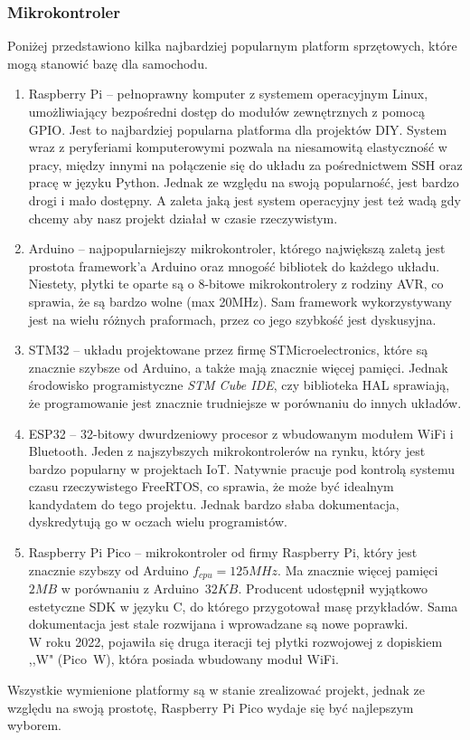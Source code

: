         \subsubsection{Mikrokontroler}
            Poniżej przedstawiono kilka najbardziej popularnym platform sprzętowych, które mogą stanowić bazę dla samochodu.
            \begin{enumerate}
                \item Raspberry Pi -- pełnoprawny komputer z systemem operacyjnym Linux, umożliwiający bezpośredni dostęp do modułów zewnętrznych z pomocą GPIO.
                Jest to najbardziej popularna platforma dla projektów DIY. System wraz z peryferiami komputerowymi pozwala na niesamowitą elastyczność w pracy, między innymi na połączenie się do układu za pośrednictwem SSH oraz pracę w języku Python.
                Jednak ze względu na swoją popularność, jest bardzo drogi i mało dostępny.
                A zaleta jaką jest system operacyjny jest też wadą gdy chcemy aby nasz projekt działał w czasie rzeczywistym.
                \item Arduino -- najpopularniejszy mikrokontroler, którego największą zaletą jest prostota framework'a Arduino oraz mnogość bibliotek do każdego układu.
                Niestety, płytki te oparte są o 8-bitowe mikrokontrolery z rodziny AVR, co sprawia, że są bardzo wolne (max 20MHz).
                Sam framework wykorzystywany jest na wielu różnych praformach, przez co jego szybkość jest dyskusyjna.
                \item STM32 -- układu projektowane przez firmę STMicroelectronics, które są znacznie szybsze od Arduino, a także mają znacznie więcej pamięci.
                Jednak środowisko programistyczne \textit{STM Cube IDE}, czy biblioteka HAL sprawiają, że programowanie jest znacznie trudniejsze w porównaniu do innych układów.
                \item ESP32 -- 32-bitowy dwurdzeniowy procesor z wbudowanym modułem WiFi i Bluetooth.
                Jeden z najszybszych mikrokontrolerów na rynku, który jest bardzo popularny w projektach IoT.
                Natywnie pracuje pod kontrolą systemu czasu rzeczywistego FreeRTOS, co sprawia, że może być idealnym kandydatem do tego projektu.
                Jednak bardzo słaba dokumentacja, dyskredytują go w oczach wielu programistów.
                \item Raspberry Pi Pico -- mikrokontroler od firmy Raspberry Pi, który jest znacznie szybszy od Arduino $f_{cpu} = 125MHz$.
                Ma znacznie więcej pamięci $2MB$ w porównaniu z Arduino~$32KB$.
                Producent udostępnił wyjątkowo estetyczne SDK w języku C, do którego przygotował masę przykładów.
                Sama dokumentacja jest stale rozwijana i wprowadzane są nowe poprawki.\\
                W roku 2022, pojawiła się druga iteracji tej płytki rozwojowej z dopiskiem ,,W" (Pico~W), która posiada wbudowany moduł WiFi.
            \end{enumerate}
            Wszystkie wymienione platformy są w stanie zrealizować projekt, jednak ze względu na swoją prostotę, Raspberry Pi Pico wydaje się być najlepszym wyborem.

